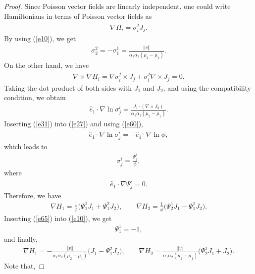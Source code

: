 \documentclass[10pt,a4paper]{amsart}
\numberwithin{equation}{section}
\begin{document}
\begin{proof}
Since Poisson vector f\/ields are linearly independent, one could write Hamiltonians in terms of Poisson vector f\/ields as
\begin{gather*}
\nabla H_{i}=\sigma _{i}^{j}J_{j}.
\end{gather*}
By using (\ref{e10}), we get
\begin{gather*}
\sigma _{2}^{2}=-\sigma _{1}^{1}=\frac{\Vert v\Vert }{\alpha_{1}\alpha _{2}(\mu _{2}-\mu _{1}) }.
\end{gather*}
On the other hand, we have
\begin{gather*}
\nabla \times \nabla H_{i}=\nabla \sigma _{i}^{j}\times J_{j}+ \sigma_{i}^{j}\nabla\times J_{j}=0.
\end{gather*}
Taking the dot product of both sides with $J_{1}$ and $J_{2}$, and using the compatibility condition, we obtain
\begin{gather}
\widehat{e}_{1}\cdot \nabla \ln \sigma _{j}^{i}=\frac{J_{1}\cdot (\nabla \times J_{2} ) }{\alpha _{1}\alpha _{2}( \mu_{2}-\mu_{1}) }. \label{e60}
\end{gather}
Inserting (\ref{e31}) into (\ref{e27}) and using (\ref{e60}),
\begin{gather*}
\widehat{e}_{1}\cdot \nabla \ln \sigma _{j}^{i}=-\widehat{e}_{1}\cdot \nabla \ln \phi,
\end{gather*}
which leads to
\begin{gather*}
\sigma _{j}^{i}=\frac{\Psi _{j}^{i}}{\phi },
\end{gather*}
where
\begin{gather*}
\widehat{e}_{1}\cdot \nabla \Psi _{j}^{i}=0.
\end{gather*}
Therefore, we have
\begin{gather}
\nabla H_{1} = \frac{1}{\phi }\big( \Psi _{1}^{1}J_{1}+\Psi_{1}^{2}J_{2}\big),\qquad \nabla H_{2} = \frac{1}{\phi }\big( \Psi_{2}^{1}J_{1}-\Psi_{1}^{1}J_{2}\big).\label{e65}
\end{gather}
Inserting (\ref{e65}) into (\ref{e10}), we get
\begin{gather*}
\Psi _{1}^{1}=-1,
\end{gather*}
and f\/inally,
\begin{gather*}
\nabla H_{1} = -\frac{\Vert v\Vert }{\alpha_{1}\alpha_{2}(\mu _{2}-\mu _{1}) }\big( J_{1}-\Psi_{1}^{2}J_{2}\big),\qquad
\nabla H_{2} = \frac{\Vert v\Vert }{\alpha_{1}\alpha_{2}(\mu _{2}-\mu _{1}) }\big( \Psi_{2}^{1}J_{1}+J_{2}\big).%
\end{gather*}
Note that,

\end{proof}
\end{document}

